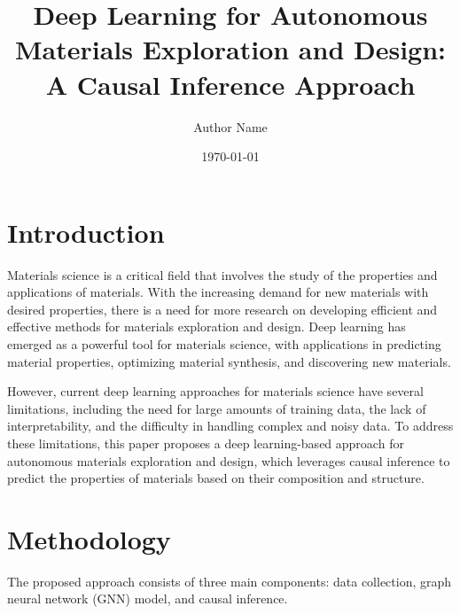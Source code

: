 \documentclass{article}
\begin{document}
\title{Deep Learning for Autonomous Materials Exploration and Design: A Causal Inference Approach}

\author{Author Name}

\date{\today}

\maketitle


\section{Introduction}

Materials science is a critical field that involves the study of the properties and applications of materials. With the increasing demand for new materials with desired properties, there is a need for more research on developing efficient and effective methods for materials exploration and design. Deep learning has emerged as a powerful tool for materials science, with applications in predicting material properties, optimizing material synthesis, and discovering new materials.

However, current deep learning approaches for materials science have several limitations, including the need for large amounts of training data, the lack of interpretability, and the difficulty in handling complex and noisy data. To address these limitations, this paper proposes a deep learning-based approach for autonomous materials exploration and design, which leverages causal inference to predict the properties of materials based on their composition and structure.

\section{Methodology}

The proposed approach consists of three main components: data collection, graph neural network (GNN) model, and causal inference.
\end{document}
